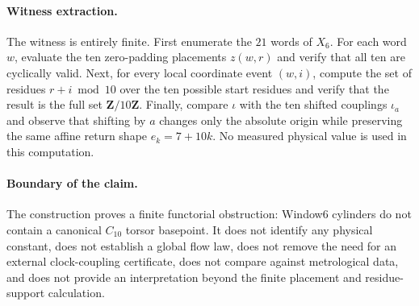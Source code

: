 \paragraph{Witness extraction.}
The witness is entirely finite. First enumerate the $21$ words of $X_6$. For each word $w$, evaluate the ten zero-padding placements $z(w,r)$ and verify that all ten are cyclically valid. Next, for every local coordinate event $(w,i)$, compute the set of residues $r+i\bmod 10$ over the ten possible start residues and verify that the result is the full set $\mathbf{Z}/10\mathbf{Z}$. Finally, compare $\iota$ with the ten shifted couplings $\iota_a$ and observe that shifting by $a$ changes only the absolute origin while preserving the same affine return shape $e_k=7+10k$. No measured physical value is used in this computation.

\paragraph{Boundary of the claim.}
The construction proves a finite functorial obstruction: Window6 cylinders do not contain a canonical $C_{10}$ torsor basepoint. It does not identify any physical constant, does not establish a global flow law, does not remove the need for an external clock-coupling certificate, does not compare against metrological data, and does not provide an interpretation beyond the finite placement and residue-support calculation.

